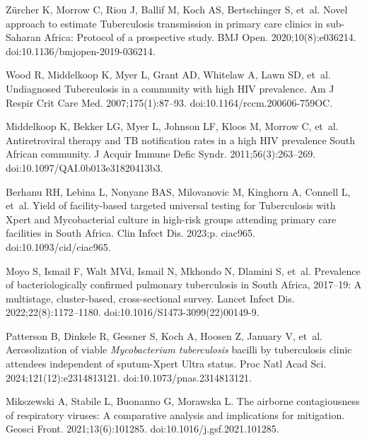 \documentclass[fleqn,11pt]{wlscirep}
\begin{document}
\begin{thebibliography}{10}
Zürcher K, Morrow C, Riou J, Ballif M, Koch AS, Bertschinger S, et~al.
\newblock Novel approach to estimate {Tuberculosis} transmission in primary
  care clinics in sub-{Saharan} {Africa}: Protocol of a prospective study.
\newblock BMJ Open. 2020;10(8):e036214.
\newblock doi:10.1136/bmjopen-2019-036214.

Wood R, Middelkoop K, Myer L, Grant AD, Whitelaw A, Lawn SD, et~al.
\newblock Undiagnosed {Tuberculosis} in a {community} with {high} {HIV}
  {prevalence}.
\newblock Am J Respir Crit Care Med. 2007;175(1):87--93.
\newblock doi:10.1164/rccm.200606-759OC.

Middelkoop K, Bekker LG, Myer L, Johnson LF, Kloos M, Morrow C, et~al.
\newblock Antiretroviral therapy and {TB} notification rates in a high {HIV}
  prevalence {South} {African} community.
\newblock J Acquir Immune Defic Syndr. 2011;56(3):263--269.
\newblock doi:10.1097/QAI.0b013e31820413b3.

Berhanu RH, Lebina L, Nonyane BAS, Milovanovic M, Kinghorn A, Connell L, et~al.
\newblock Yield of facility-based targeted universal testing for {Tuberculosis}
  with {Xpert} and {Mycobacterial} culture in high-risk groups attending
  primary care facilities in {South} {Africa}.
\newblock Clin Infect Dis. 2023;p. ciac965.
\newblock doi:10.1093/cid/ciac965.

Moyo S, Ismail F, Walt MVd, Ismail N, Mkhondo N, Dlamini S, et~al.
\newblock Prevalence of bacteriologically confirmed pulmonary tuberculosis in
  {South} {Africa}, 2017–19: {A} multistage, cluster-based, cross-sectional
  survey.
\newblock Lancet Infect Dis. 2022;22(8):1172--1180.
\newblock doi:10.1016/S1473-3099(22)00149-9.

Patterson B, Dinkele R, Gessner S, Koch A, Hoosen Z, January V, et~al.
\newblock Aerosolization of viable \textit{{Mycobacterium} tuberculosis}
  bacilli by tuberculosis clinic attendees independent of sputum-{Xpert}
  {Ultra} status.
\newblock Proc Natl Acad Sci. 2024;121(12):e2314813121.
\newblock doi:10.1073/pnas.2314813121.

Mikszewski A, Stabile L, Buonanno G, Morawska L.
\newblock The airborne contagiousness of respiratory viruses: {A} comparative
  analysis and implications for mitigation.
\newblock Geosci Front. 2021;13(6):101285.
\newblock doi:10.1016/j.gsf.2021.101285.


\end{thebibliography}
\end{document}
